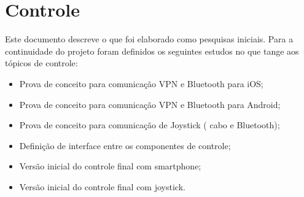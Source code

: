 \section{Controle}

Este documento descreve o que foi elaborado como pesquisas iniciais. Para a continuidade do projeto foram definidos os  seguintes estudos no que tange aos tópicos de controle:

\begin{itemize}
 \item Prova de conceito para comunicação VPN e Bluetooth para iOS;
 \item Prova de conceito para comunicação VPN e Bluetooth para Android;
 \item Prova de conceito para comunicação de Joystick ( cabo e Bluetooth);
 \item Definição de interface entre os componentes de controle;
 \item Versão inicial do controle final com smartphone;
 \item Versão inicial do controle final com joystick.
\end{itemize}
